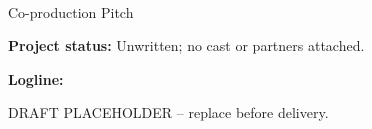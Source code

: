 \documentclass[11pt,letterpaper]{article}
\begin{document}
\begin{center}
{\Large\bfseries\sffamily \filmtitleupper}\\[6pt]
Co-production Pitch
\end{center}
\textbf{Project status:} Unwritten; no cast or partners attached.

\textbf{Logline:} \filmlogline

DRAFT PLACEHOLDER -- replace before delivery.
\end{document}
